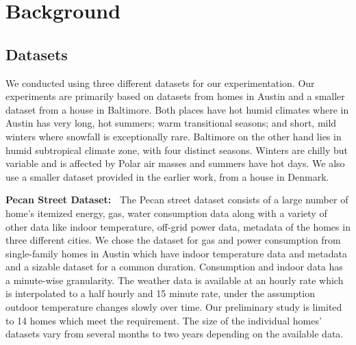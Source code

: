 \documentclass{sig-alternate}
\begin{document}
%



\section{Background}

\subsection{Datasets}
\indent We conducted using three different datasets for our experimentation. Our experiments are primarily based on datasets from homes in Austin and a smaller dataset from a house in Baltimore. Both places have hot humid climates where in Austin has very long, hot summers; warm transitional seasons; and short, mild winters where snowfall is exceptionally rare. Baltimore on the other hand lies in humid subtropical climate zone, with four distinct seasons. Winters are chilly but variable and is affected by Polar air masses and summers have hot days. We also use a smaller dataset provided in the earlier work, from a house in Denmark.

\indent \textbf{Pecan Street Dataset:~\cite{Pecan}} The Pecan street dataset consists of a large number of home's itemized energy, gas, water consumption data along with a variety of other data like indoor temperature, off-grid power data, metadata of the homes in three different cities. We chose the dataset for gas and power consumption from single-family homes in Austin which have indoor temperature data and metadata and a sizable dataset for a common duration. Consumption and indoor data has a minute-wise granularity. The weather data is available at an hourly rate which is interpolated to a half hourly and 15 minute rate, under the assumption outdoor temperature changes slowly over time. Our preliminary study is limited to 14 homes which meet the requirement. The size of the individual homes' datasets vary from several months to two years depending on the available data. 
\end{document}
